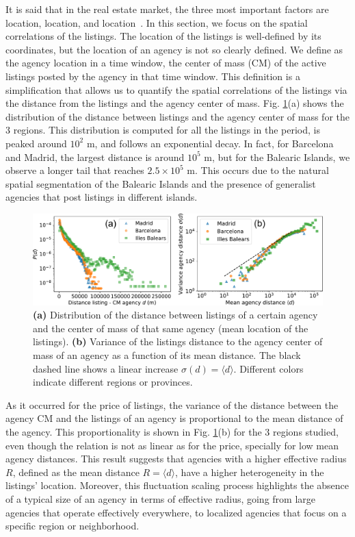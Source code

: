 It is said that in the real estate market, the three most important factors are location, location, and location~\cite{rosen1974hedonic}. In this section, we focus on the spatial correlations of the listings. The location of the listings is well-defined by its coordinates, but the location of an agency is not so clearly defined. We define as the agency location in a time window, the center of mass (CM) of the active listings posted by the agency in that time window. This definition is a simplification that allows us to quantify the spatial correlations of the listings via the distance from the listings and the agency center of mass. Fig. \ref{fig:distance_panel}(a) shows the distribution of the distance between listings and the agency center of mass for the 3 regions. This distribution is computed for all the listings in the period, is peaked around $10^2$ m, and follows an exponential decay. In fact, for Barcelona and Madrid, the largest distance is around $10^5$ m, but for the Balearic Islands, we observe a longer tail that reaches $2.5 \times 10^5$ m. This occurs due to the natural spatial segmentation of the Balearic Islands and the presence of generalist agencies that post listings in different islands.

\begin{figure}
    \centering
    \includegraphics[width =\textwidth]{Figs/Idealista_dynamics/distance_panel.pdf}
	\caption[Distance correlations.]{\textbf{(a)} Distribution of the distance between listings of a certain agency and the center of mass of that same agency (mean location of the listings). \textbf{(b)} Variance of the listings distance to the agency center of mass of an agency as a function of its mean distance. The black dashed line shows a linear increase $\sigma(d) = \langle d \rangle$. Different colors indicate different regions or provinces. \label{fig:distance_panel}}
\end{figure}

As it occurred for the price of listings, the variance of the distance between the agency CM and the listings of an agency is proportional to the mean distance of the agency. This proportionality is shown in Fig. \ref{fig:distance_panel}(b) for the 3 regions studied, even though the relation is not as linear as for the price, specially for low mean agency distances. This result suggests that agencies with a higher effective radius $R$, defined as the mean distance $R = \langle d \rangle$, have a higher heterogeneity in the listings' location. Moreover, this fluctuation scaling process highlights the absence of a typical size of an agency in terms of  effective radius, going from large agencies that operate effectively everywhere, to localized agencies that focus on a specific region or neighborhood.

